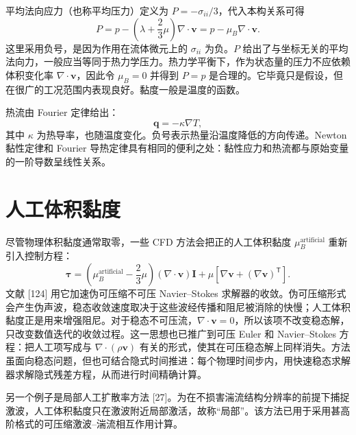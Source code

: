 \documentclass[11pt,a4paper,openany,fontset=none]{ctexbook}
\begin{document}
平均法向应力（也称平均压力）定义为 $P=-\sigma_{ii}/3$，代入本构关系可得
\begin{equation}
 P=p-\left(\lambda+\frac{2}{3}\mu\right)\nabla\cdot\bm v
   =p-\mu_B\nabla\cdot\bm v. \tag{4.2.4}
\end{equation}
这里采用负号，是因为作用在流体微元上的 $\sigma_{ii}$ 为负。$P$ 给出了与坐标无关的平均法向力，一般应当等同于热力学压力。热力学平衡下，作为状态量的压力不应依赖体积变化率 $\nabla\cdot\bm v$，因此令 $\mu_B=0$ 并得到 $P=p$ 是合理的。它毕竟只是假设，但在很广的工况范围内表现良好。黏度一般是温度的函数。

热流由 Fourier 定律给出：
\begin{equation}
 \bm q=-\kappa\nabla T, \tag{4.2.5}
\end{equation}
其中 $\kappa$ 为热导率，也随温度变化。负号表示热量沿温度降低的方向传递。Newton 黏性定律和 Fourier 导热定律具有相同的便利之处：黏性应力和热流都与原始变量的一阶导数呈线性关系。

\section{人工体积黏度}

尽管物理体积黏度通常取零，一些 CFD 方法会把正的人工体积黏度 $\mu_B^{\mathrm{artificial}}$ 重新引入控制方程：
\begin{equation}
 \bm\tau=\left(\mu_B^{\mathrm{artificial}}-\frac{2}{3}\mu\right)
 (\nabla\cdot\bm v)\bm I+
 \mu\left[\nabla\bm v+(\nabla\bm v)^{\mathsf T}\right]. \tag{4.3.1}
\end{equation}
文献 [124] 用它加速伪可压缩不可压 Navier--Stokes 求解器的收敛。伪可压缩形式会产生伪声波，稳态收敛速度取决于这些波经传播和阻尼被消除的快慢；人工体积黏度正是用来增强阻尼。对于稳态不可压流，$\nabla\cdot\bm v=0$，所以该项不改变稳态解，只改变数值迭代的收敛过程。这一思想也已推广到可压 Euler 和 Navier--Stokes 方程：把人工项写成与 $\nabla\cdot(\rho\bm v)$ 有关的形式，使其在可压稳态解上同样消失。方法虽面向稳态问题，但也可结合隐式时间推进：每个物理时间步内，用快速稳态求解器求解隐式残差方程，从而进行时间精确计算。

另一个例子是局部人工扩散率方法 [27]。为在不损害湍流结构分辨率的前提下捕捉激波，人工体积黏度只在激波附近局部激活，故称“局部”。该方法已用于采用甚高阶格式的可压缩激波--湍流相互作用计算。
\end{document}
